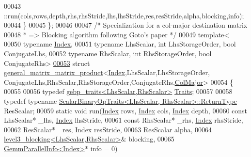 \begin{DoxyCode}
00043     ::run(cols,rows,depth,rhs,rhsStride,lhs,lhsStride,res,resStride,alpha,blocking,info);
00044   \}
00045 \};
00046 
00047 \textcolor{comment}{/*  Specialization for a col-major destination matrix}
00048 \textcolor{comment}{ *    => Blocking algorithm following Goto's paper */}
00049 \textcolor{keyword}{template}<
00050   \textcolor{keyword}{typename} \hyperlink{namespace_eigen_a62e77e0933482dafde8fe197d9a2cfde}{Index},
00051   \textcolor{keyword}{typename} LhsScalar, \textcolor{keywordtype}{int} LhsStorageOrder, \textcolor{keywordtype}{bool} ConjugateLhs,
00052   \textcolor{keyword}{typename} RhsScalar, \textcolor{keywordtype}{int} RhsStorageOrder, \textcolor{keywordtype}{bool} ConjugateRhs>
\hyperlink{struct_eigen_1_1internal_1_1general__matrix__matrix__product_3_01_index_00_01_lhs_scalar_00_01_lc92e3fc5d91273c14187477f2d000bbe}{00053} \textcolor{keyword}{struct }\hyperlink{struct_eigen_1_1internal_1_1general__matrix__matrix__product}{general\_matrix\_matrix\_product}<\hyperlink{namespace_eigen_a62e77e0933482dafde8fe197d9a2cfde}{Index},LhsScalar,LhsStorageOrder,
      ConjugateLhs,RhsScalar,RhsStorageOrder,ConjugateRhs,\hyperlink{group__enums_ggaacded1a18ae58b0f554751f6cdf9eb13a0cbd4bdd0abcfc0224c5fcb5e4f6669a}{ColMajor}>
00054 \{
00055 
00056 \textcolor{keyword}{typedef} \hyperlink{class_eigen_1_1internal_1_1gebp__traits}{gebp\_traits<LhsScalar,RhsScalar>} \hyperlink{class_eigen_1_1internal_1_1gebp__traits}{Traits};
00057 
00058 \textcolor{keyword}{typedef} \textcolor{keyword}{typename} \hyperlink{group___core___module_struct_eigen_1_1_scalar_binary_op_traits}{ScalarBinaryOpTraits<LhsScalar, RhsScalar>::ReturnType}
       ResScalar;
00059 \textcolor{keyword}{static} \textcolor{keywordtype}{void} run(\hyperlink{namespace_eigen_a62e77e0933482dafde8fe197d9a2cfde}{Index} rows, \hyperlink{namespace_eigen_a62e77e0933482dafde8fe197d9a2cfde}{Index} cols, \hyperlink{namespace_eigen_a62e77e0933482dafde8fe197d9a2cfde}{Index} depth,
00060   \textcolor{keyword}{const} LhsScalar* \_lhs, \hyperlink{namespace_eigen_a62e77e0933482dafde8fe197d9a2cfde}{Index} lhsStride,
00061   \textcolor{keyword}{const} RhsScalar* \_rhs, \hyperlink{namespace_eigen_a62e77e0933482dafde8fe197d9a2cfde}{Index} rhsStride,
00062   ResScalar* \_res, \hyperlink{namespace_eigen_a62e77e0933482dafde8fe197d9a2cfde}{Index} resStride,
00063   ResScalar alpha,
00064   \hyperlink{class_eigen_1_1internal_1_1level3__blocking}{level3\_blocking<LhsScalar,RhsScalar>}& blocking,
00065   \hyperlink{struct_eigen_1_1internal_1_1_gemm_parallel_info}{GemmParallelInfo<Index>}* info = 0)

\end{DoxyCode}
